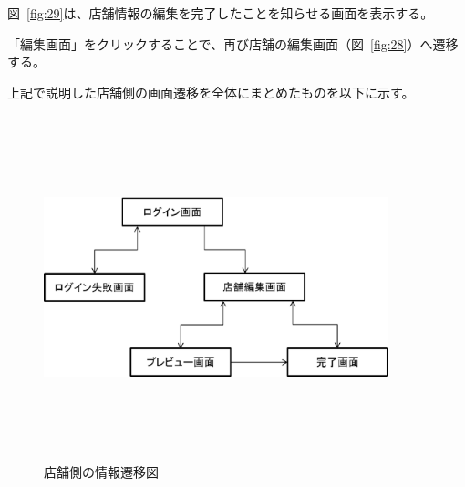 図~\ref{fig:29}は、店舗情報の編集を完了したことを知らせる画面を表示する。



「編集画面」をクリックすることで、再び店舗の編集画面（図~\ref{fig:28}）へ遷移する。
\clearpage

上記で説明した店舗側の画面遷移を全体にまとめたものを以下に示す。
\begin {figure}[!htbp]
    \begin{center}
    \includegraphics [height=10cm, width=10cm]{32.eps}
    \caption {店舗側の情報遷移図}
    \label {fig:32}
    \end{center}
\end {figure}



